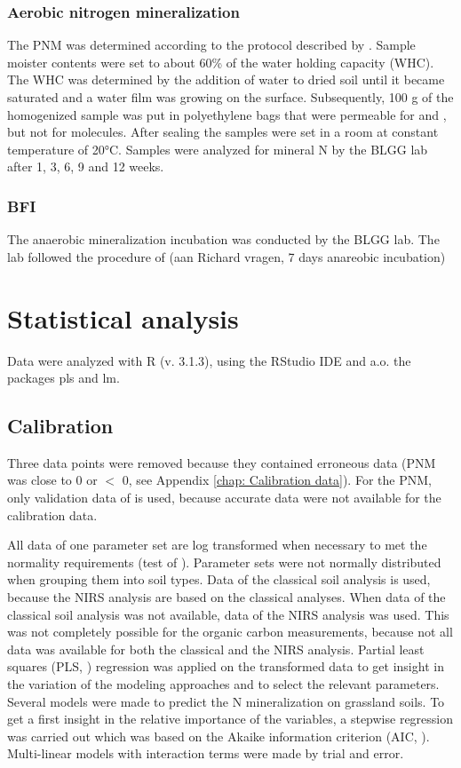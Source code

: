 \documentclass[10pt,twoside,dutch,english]{report}
\begin{document}
\subsubsection{Aerobic nitrogen mineralization}
The PNM was determined according to the protocol described by \citet{Ros2014}. Sample moister contents were set to about 60\% of the water holding capacity (WHC). The WHC was determined by the addition of water to dried soil until it became saturated and a water film was growing on the surface. Subsequently, 100 g of the homogenized sample was put in polyethylene bags that were permeable for  and  , but not for  molecules. After sealing the samples were set in a room at constant temperature of 20°C. Samples were analyzed for mineral N by the BLGG lab after 1, 3, 6, 9 and 12 weeks. 

\subsubsection{BFI}
The anaerobic mineralization incubation was conducted by the BLGG lab. The lab followed the procedure of (aan Richard vragen, 7 days anareobic incubation)



\section{Statistical analysis}
Data were analyzed with R (v. 3.1.3), using the RStudio IDE and a.o. the packages pls and lm. 
\subsection{Calibration}
Three data points were removed because they contained erroneous data (PNM was close to 0 or $<$ 0, see Appendix \ref{chap: Calibration data}). For the PNM, only validation data of  is used, because accurate  data were not available for the calibration data. 

All data of one parameter set are log transformed when necessary to met the normality requirements (test of \citet{Shapiro1965}). Parameter sets were not normally distributed when grouping them into soil types. Data of the classical soil analysis is used, because the NIRS analysis are based on the classical analyses. When data of the classical soil analysis was not available, data of the NIRS analysis was used. This was not completely possible for the organic carbon measurements, because not all data was available for both the classical and the NIRS analysis. 
Partial least squares (PLS, \citep{Mevik2013}) regression was applied on the transformed data to get insight in the variation of the modeling approaches and to select the relevant parameters. 
Several models were made to predict the N mineralization on grassland soils. To get a first insight in the relative importance of the variables, a stepwise regression was carried out which was based on the Akaike information criterion (AIC, \citep{Sakamoto1986}). Multi-linear models with interaction terms were made by trial and error. 
\end{document}
